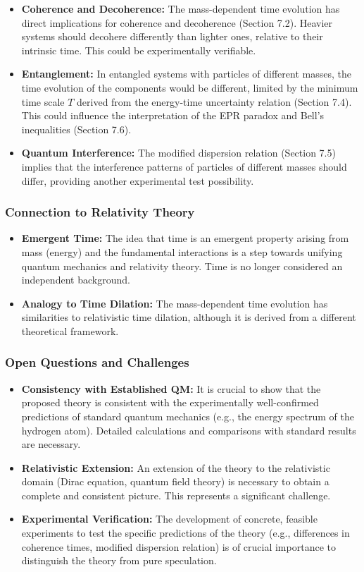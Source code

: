 \documentclass{article}
\begin{document}
\begin{itemize}
\item \textbf{Coherence and Decoherence:} The mass-dependent time evolution has direct implications for coherence and decoherence (Section 7.2). Heavier systems should decohere differently than lighter ones, relative to their intrinsic time. This could be experimentally verifiable.
\item \textbf{Entanglement:} In entangled systems with particles of different masses, the time evolution of the components would be different, limited by the minimum time scale \(T\) derived from the energy-time uncertainty relation (Section 7.4). This could influence the interpretation of the EPR paradox and Bell's inequalities (Section 7.6).
\item \textbf{Quantum Interference:} The modified dispersion relation (Section 7.5) implies that the interference patterns of particles of different masses should differ, providing another experimental test possibility.
\end{itemize}

\subsubsection{Connection to Relativity Theory}

\begin{itemize}
\item \textbf{Emergent Time:} The idea that time is an emergent property arising from mass (energy) and the fundamental interactions is a step towards unifying quantum mechanics and relativity theory. Time is no longer considered an independent background.
\item \textbf{Analogy to Time Dilation:} The mass-dependent time evolution has similarities to relativistic time dilation, although it is derived from a different theoretical framework.
\end{itemize}

\subsubsection{Open Questions and Challenges}

\begin{itemize}
\item \textbf{Consistency with Established QM:} It is crucial to show that the proposed theory is consistent with the experimentally well-confirmed predictions of standard quantum mechanics (e.g., the energy spectrum of the hydrogen atom). Detailed calculations and comparisons with standard results are necessary.
\item \textbf{Relativistic Extension:} An extension of the theory to the relativistic domain (Dirac equation, quantum field theory) is necessary to obtain a complete and consistent picture. This represents a significant challenge.
\item \textbf{Experimental Verification:} The development of concrete, feasible experiments to test the specific predictions of the theory (e.g., differences in coherence times, modified dispersion relation) is of crucial importance to distinguish the theory from pure speculation.
\end{itemize}
\end{document}
